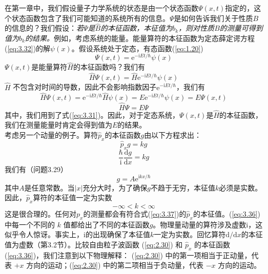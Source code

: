 	\indent 在第一章中，我们假设量子力学系统的状态是由一个状态函数$\Psi$$\left(x,t\right)$指定的，这个状态函数包含了我们可能知道的系统所有的信息。$\Psi$是如何告诉我们关于性质$B$的信息的？我们假设：\textit{若$\Psi$是$\hat{B}$的本征函数，本征值为$b_k$，则对性质$B$的测量可得到值为$b_k$的结果。}例如，考虑系统的能量。能量算符的本征函数为定态薛定谔方程(\ref{eq:3.32})的解$\psi\left(x\right)$。假设系统处于定态，有态函数(\ref{eq:1.20})
	\begin{equation}
		\Psi\left(x,t\right) = \mathrm{e}^{-\mathrm{i}Et/\hbar}\psi\left(x\right)
		\label{eq:3.33}
	\end{equation}
	$\Psi\left(x,t\right)$是能量算符$\hat{H}$的本征函数吗？我们有
	\begin{equation*}
		\hat{H}\Psi\left(x,t\right) = \hat{H}\mathrm{e}^{-\mathrm{i}Et/\hbar}\psi\left(x\right)
	\end{equation*}
	$\hat{H}$ 不包含对时间的导数，因此不会影响指数因子$\mathrm{e}^{-\mathrm{i}Et/\hbar}$，我们有
	\begin{equation*}
		\hat{H}\Psi\left(x,t\right) = \mathrm{e}^{-\mathrm{i}Et/\hbar}\hat{H}\psi\left(x\right) = E \mathrm{e}^{-\mathrm{i}Et/\hbar} \psi\left(x\right) = E \Psi\left(x,t\right)
	\end{equation*}
	\begin{equation}
		\hat{H}\Psi = E\Psi
		\label{eq:3.34}
	\end{equation}
	其中，我们用到了式(\ref{eq:3.31})。因此，对于定态系统，$\Psi\left(x,t\right)$是$\hat{H}$的本征函数，我们在测量能量时肯定会得到值为$E$的结果。\\
	\indent 考虑另一个动量的例子。算符$\hat{p}_x$的本征函数$g$由以下方程求出：
	\begin{equation*}
		\hat{p}_x g =kg
	\end{equation*}
	\begin{equation}
		\frac{\hbar}{\mathrm{i}} \frac{\mathrm{d}g}{\mathrm{d}x} = kg
		\label{eq:3.35}
	\end{equation}
	我们有（问题3.29）
	\begin{equation}
		g = A\mathrm{e}^{\mathrm{i}kx/\hbar}
		\label{eq:3.36}
	\end{equation}
	其中$A$是任意常数。当$\left|x\right|$充分大时，为了确保$g$不趋于无穷，本征值$k$必须是实数。因此，$\hat{p}_x$算符的本征值一定为实数
	\begin{equation}
		-\infty < k < \infty
		\label{eq:3.37}
	\end{equation}
	这是很合理的。任何对$p_x$的测量都会有符合式(\ref{eq:3.37})的$\hat{p}_x$的本征值。(\ref{eq:3.36}) 中每一个不同的 $k$ 值都给出了不同的本征函数$g$。物理量动量的算符涉及虚数$\mathrm{i}$，这似乎令人惊讶。事实上，$\mathrm{i}$的出现确保了本征值$k$一定为实数。回忆算符$\mathrm{d}/\mathrm{d}x$的本征值为虚数（第3.2节）。比较自由粒子波函数 (\ref{eq:2.30}) 和 $\hat{p}_x$ 的本征函数 (\ref{eq:3.36})，我们注意到以下物理解释： (\ref{eq:2.30}) 中的第一项相当于正动量，代表 $+x$ 方向的运动；(\ref{eq:2.30}) 中的第二项相当于负动量，代表 $-x$ 方向的运动。\\
$$
